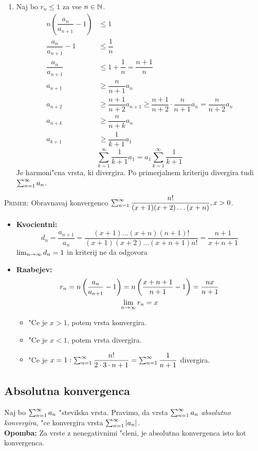 \begin{enumerate}[1)]
	\item Naj bo $r_n \leq 1$ za vse $n \in \mathbb{N}$.
	\begin{align*}
	n\left(\dfrac{a_n}{a_{n+1}} - 1\right) &\leq 1 \\
	\dfrac{a_n}{a_{n+1}} - 1 &\leq \dfrac{1}{n} \\
	\dfrac{a_n}{a_{n+1}} &\leq 1 + \dfrac{1}{n} = \dfrac{n+1}{n} \\
	a_{n+1} &\geq \dfrac{n}{n+1}a_n \\	
	a_{n+2} &\geq \dfrac{n+1}{n+2}a_{n+1} \geq \dfrac{n+1}{n+2} \cdot \dfrac{n}{n+1}a_n = \dfrac{n}{n+2}a_n \\
	a_{n+k} &\geq \dfrac{n}{n+k}a_n \\
	a_{k+1} &\geq \dfrac{1}{k+1}a_1
	\end{align*}
	\begin{equation*}
	\sum_{k = 1}^{\infty}\dfrac{1}{k+1}a_1 = a_1 \sum_{k=1}^{\infty}\dfrac{1}{k+1}
	\end{equation*}
	Je harmoni"cna vrsta, ki divergira. Po primerjalnem kriteriju divergira tudi $\sum_{n = 1}^{\infty}a_n$.
\end{enumerate}
\textsc{Primer:} Obravnavaj konvergenco $\sum_{n = 1}^{\infty}\dfrac{n!}{(x+1)(x+2)\ldots(x+n)}, x > 0$.
\begin{itemize}
	\item \textbf{Kvocientni:}
	\begin{equation*}
	d_n = \dfrac{a_{n+1}}{a_n} = \dfrac{(x+1)\ldots(x+n)(n+1)!}{(x+1)(x+2)\ldots(x+n+1)n!} = \dfrac{n+1}{x+n+1}
	\end{equation*}
	$\lim_{n \rightarrow \infty} d_n = 1$ in kriterij ne da odgovora
	\item \textbf{Raabejev:}
	\begin{gather*}
	r_n = n\left(\dfrac{a_n}{a_{n+1}}-1\right) = n\left(\dfrac{x+n+1}{n+1} - 1\right) = \dfrac{nx}{n+1} \\
	\lim_{n \rightarrow \infty} r_n = x
	\end{gather*}
	\begin{itemize}
		\item "Ce je $x > 1$, potem vrsta konvergira.
		\item "Ce je $x < 1$, potem vrsta divergira.
		\item "Ce je $x = 1: \sum_{n = 1}^{\infty}\dfrac{n!}{2\cdot3\cdot n+1} = \sum_{n = 1}^{\infty}\dfrac{1}{n+1}$ divergira.
	\end{itemize}
\end{itemize}
%
\subsection{Absolutna konvergenca}
 Naj bo $\sum_{n = 1}^{\infty}a_n$ "stevilska vrsta. Pravimo, da vrsta $\sum_{n = 1}^{\infty}a_n$ \emph{absolutno konvergira}, "ce konvergira vrsta $\sum_{n = 1}^{\infty}|a_n|$. \\
\textbf{Opomba:} Za vrste z nenegativnimi "cleni, je absolutna konvergenca isto kot konvergenca.

